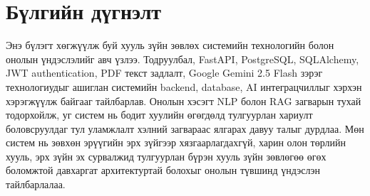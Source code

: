 \section{Бүлгийн дүгнэлт}

Энэ бүлэгт хөгжүүлж буй хууль зүйн зөвлөх системийн технологийн болон онолын үндэслэлийг авч үзлээ. Тодруулбал, FastAPI, PostgreSQL, SQLAlchemy, JWT authentication, PDF текст задлалт, Google Gemini 2.5 Flash зэрэг технологиудыг ашиглан системийн backend, database, AI интеграцчиллыг хэрхэн хэрэгжүүлж байгааг тайлбарлав. Онолын хэсэгт NLP болон RAG загварын тухай тодорхойлж, уг систем нь бодит хуулийн өгөгдөлд тулгуурлан хариулт боловсруулдаг тул уламжлалт хэлний загвараас ялгарах давуу талыг дурдлаа. Мөн систем нь зөвхөн эрүүгийн эрх зүйгээр хязгаарлагдахгүй, харин олон төрлийн хууль, эрх зүйн эх сурвалжид тулгуурлан бүрэн хууль зүйн зөвлөгөө өгөх боломжтой давхаргат архитектуртай болохыг онолын түвшинд үндэслэн тайлбарлалаа.